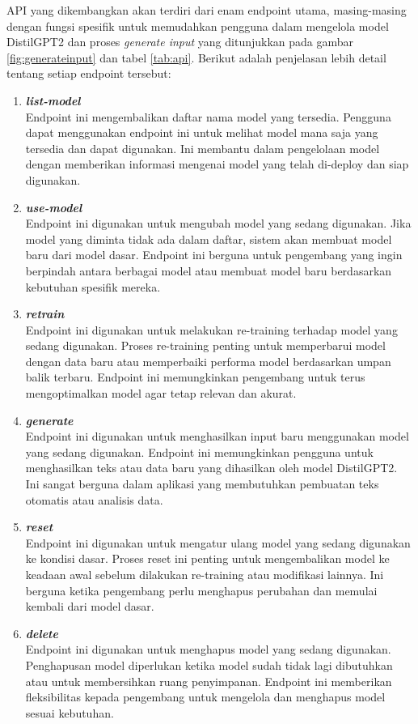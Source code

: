 API yang dikembangkan akan terdiri dari enam endpoint utama, masing-masing 
dengan fungsi spesifik untuk memudahkan pengguna dalam mengelola model 
DistilGPT2 dan proses \emph{generate input} yang ditunjukkan pada 
gambar \ref{fig:generateinput} dan tabel \ref{tab:api}.
Berikut adalah penjelasan lebih 
detail tentang setiap endpoint tersebut:

\begin{enumerate}[topsep=0pt, noitemsep]
    \item \textbf{\emph{list-model}}\\
    Endpoint ini mengembalikan daftar nama model yang tersedia. Pengguna dapat menggunakan endpoint ini untuk melihat model mana saja yang tersedia dan dapat digunakan. Ini membantu dalam pengelolaan model dengan memberikan informasi mengenai model yang telah di-deploy dan siap digunakan.
    
    \item \textbf{\emph{use-model}}\\
    Endpoint ini digunakan untuk mengubah model yang sedang digunakan. Jika model yang diminta tidak ada dalam daftar, sistem akan membuat model baru dari model dasar. Endpoint ini berguna untuk pengembang yang ingin berpindah antara berbagai model atau membuat model baru berdasarkan kebutuhan spesifik mereka.
    
    \item \textbf{\emph{retrain}}\\
    Endpoint ini digunakan untuk melakukan re-training terhadap model yang sedang digunakan. Proses re-training penting untuk memperbarui model dengan data baru atau memperbaiki performa model berdasarkan umpan balik terbaru. Endpoint ini memungkinkan pengembang untuk terus mengoptimalkan model agar tetap relevan dan akurat.
    
    \item \textbf{\emph{generate}}\\
    Endpoint ini digunakan untuk menghasilkan input baru menggunakan model yang sedang digunakan. Endpoint ini memungkinkan pengguna untuk menghasilkan teks atau data baru yang dihasilkan oleh model DistilGPT2. Ini sangat berguna dalam aplikasi yang membutuhkan pembuatan teks otomatis atau analisis data.
    
    \item \textbf{\emph{reset}}\\
    Endpoint ini digunakan untuk mengatur ulang model yang sedang digunakan ke kondisi dasar. Proses reset ini penting untuk mengembalikan model ke keadaan awal sebelum dilakukan re-training atau modifikasi lainnya. Ini berguna ketika pengembang perlu menghapus perubahan dan memulai kembali dari model dasar.
    \\
    
    \item \textbf{\emph{delete}}\\
    Endpoint ini digunakan untuk menghapus model yang sedang digunakan. Penghapusan model diperlukan ketika model sudah tidak lagi dibutuhkan atau untuk membersihkan ruang penyimpanan. Endpoint ini memberikan fleksibilitas kepada pengembang untuk mengelola dan menghapus model sesuai kebutuhan.
\end{enumerate}

